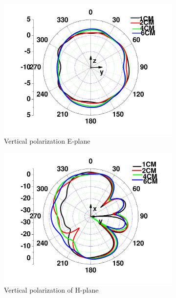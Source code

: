 \documentclass[journal]{IEEEtran}
\begin{document}
\begin{figure}[!htb]
\begin{subfigure}[b]{0.24\textwidth}
\includegraphics[width=\textwidth]{figs/12c.pdf}
\caption{Vertical polarization E-plane}
\label{fig:12c}
\end{subfigure}
\begin{subfigure}[b]{0.24\textwidth}
\includegraphics[width=\textwidth]{figs/12d.pdf}
\caption{Vertical polarization of H-plane}
\label{fig:12d}	
\end{subfigure}
\begin{subfigure}[b]{0.24\textwidth}

\end{subfigure}
\end{figure}
\end{document}
